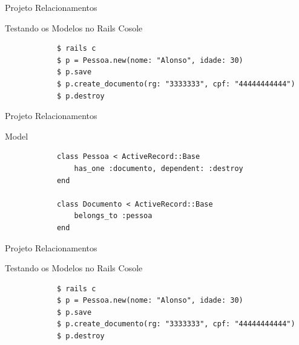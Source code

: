 \documentclass{beamer}
\begin{document}
\begin{frame}[fragile]{Projeto Relacionamentos}
	\begin{block} {\LARGE Testando os Modelos no Rails Cosole}
		\begin{verbatim}
			$ rails c
			$ p = Pessoa.new(nome: "Alonso", idade: 30)
			$ p.save
			$ p.create_documento(rg: "3333333", cpf: "44444444444")
			$ p.destroy
		\end{verbatim}
	\end{block}
\end{frame}

\begin{frame}[fragile]{Projeto Relacionamentos}
	\begin{block} {\LARGE Model}
		\begin{verbatim}
		  	class Pessoa < ActiveRecord::Base
		  	    has_one :documento, dependent: :destroy
		  	end
		  	
		  	class Documento < ActiveRecord::Base
		  	    belongs_to :pessoa
		  	end
		\end{verbatim}
	\end{block}
\end{frame}

\begin{frame}[fragile]{Projeto Relacionamentos}
	\begin{block} {\LARGE Testando os Modelos no Rails Cosole}
		\begin{verbatim}
			$ rails c
			$ p = Pessoa.new(nome: "Alonso", idade: 30)
			$ p.save
			$ p.create_documento(rg: "3333333", cpf: "44444444444")
			$ p.destroy
		\end{verbatim}
	\end{block}
\end{frame}
\end{document}
